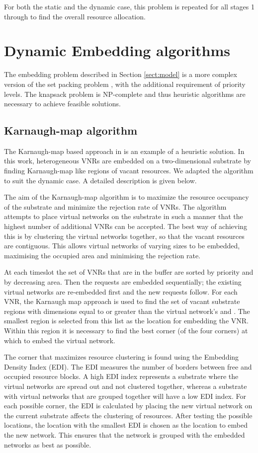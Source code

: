 \documentclass[conference]{IEEEtran}
\begin{document}
For both the static and the dynamic case, this problem is repeated for all stages 1 through  to find the overall resource allocation.


\section{Dynamic Embedding algorithms}
\label{sect:implementation}

The embedding problem described in Section \ref{sect:model} is a more complex version of the set packing problem \cite{Crescenzi1998}, with the additional requirement of priority levels. The knapsack problem is NP-complete and thus heuristic algorithms are necessary to achieve feasible solutions.

\subsection{Karnaugh-map algorithm}
The Karnaugh-map based approach in \cite{Yang2012} is an example of a heuristic solution. In this work, heterogeneous VNRs are embedded on a two-dimensional substrate by finding Karnaugh-map like regions of vacant resources. We adapted the algorithm to suit the dynamic case. A detailed description is given below.

The aim of the Karnaugh-map algorithm is to maximize the resource occupancy of the substrate and minimize the rejection rate of VNRs. The algorithm attempts to place virtual networks on the substrate in such a manner that the highest number of additional VNRs can be accepted. The best way of achieving this is by clustering the virtual networks together, so that the vacant resources are contiguous. This allows virtual networks of varying sizes to be embedded, maximising the occupied area and minimising the rejection rate.

At each timeslot the set of VNRs that are in the buffer are sorted by priority and by decreasing area. Then the requests are embedded sequentially; the existing virtual networks are re-embedded first and the new requests follow. For each VNR, the Karnaugh map approach is used to find the set of vacant substrate regions with dimensions equal to or greater than the virtual network's  and . The smallest region is selected from this list as the location for embedding the VNR. Within this region it is necessary to find the best corner (of the four corners) at which to embed the virtual network.

The corner that maximizes resource clustering is found using the Embedding Density Index (EDI). The EDI measures the number of borders between free and occupied resource blocks. A high EDI index represents a substrate where the virtual networks are spread out and not clustered together, whereas a substrate with virtual networks that are grouped together will have a low EDI index. For each possible corner, the EDI is calculated by placing the new virtual network on the current substrate affects the clustering of resources. After testing the possible locations, the location with the smallest EDI is chosen as the location to embed the new network. This ensures that the network is grouped with the embedded networks as best as possible.
\end{document}
